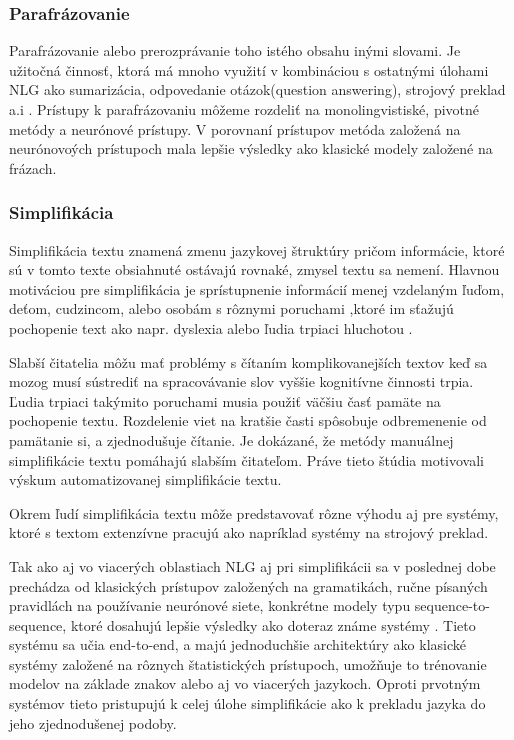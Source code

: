 \subsubsection{Parafrázovanie}
Parafrázovanie alebo prerozprávanie toho istého obsahu inými slovami. Je užitočná činnosť, ktorá má mnoho využití v kombináciou s ostatnými úlohami NLG ako sumarizácia, odpovedanie otázok(question answering), strojový preklad a.i \cite{Colin_2018_para}\cite{Mallinson_2017_para_w_mt}.
Prístupy k parafrázovaniu môžeme rozdeliť na monolingvistiské, pivotné metódy a neurónové prístupy. V porovnaní prístupov metóda založená na neurónovoých prístupoch mala lepšie výsledky ako klasické modely založené na frázach\cite{Mallinson_2017_para_w_mt}.

\subsubsection{Simplifikácia}
   Simplifikácia textu znamená zmenu jazykovej štruktúry pričom informácie, ktoré sú v tomto texte obsiahnuté ostávajú rovnaké, zmysel textu sa nemení. Hlavnou motiváciou pre simplifikácia je sprístupnenie informácií menej vzdelaným ľuďom, deťom, cudzincom, alebo osobám s rôznymi poruchami ,ktoré im sťažujú pochopenie text ako napr. dyslexia alebo ľudia trpiaci hluchotou \cite{Inui_2003_simpl_assist}.
   
   Slabší čitatelia môžu mať problémy s čítaním komplikovanejších textov keď sa mozog musí sústrediť na spracovávanie slov vyššie kognitívne činnosti trpia. Ľudia trpiaci takýmito poruchami musia použiť väčšiu časť pamäte na pochopenie textu. Rozdelenie viet na kratšie časti spôsobuje odbremenenie od pamätanie si, a zjednodušuje čítanie. Je dokázané, že metódy manuálnej simplifikácie textu pomáhajú slabším čitateľom. Práve tieto štúdia motivovali výskum automatizovanej simplifikácie textu\cite{siddharthan_2014_simpl}.
   
   Okrem ľudí simplifikácia textu môže predstavovať rôzne výhodu aj pre systémy, ktoré s textom extenzívne pracujú ako napríklad systémy na strojový preklad\cite{Chandrasekar_1996_simpl_moti}.
    
    Tak ako aj vo viacerých oblastiach NLG aj pri simplifikácii sa v poslednej dobe prechádza od klasických prístupov založených na gramatikách, ručne písaných pravidlách na používanie neurónové siete, konkrétne modely typu sequence-to-sequence, ktoré dosahujú lepšie výsledky ako doteraz známe systémy \cite{Nisioi_2017_simpl_expl}. Tieto systému sa učia end-to-end, a majú jednoduchšie architektúry ako klasické systémy založené na rôznych štatistických prístupoch, umožňuje to trénovanie modelov na základe znakov alebo aj vo viacerých jazykoch. Oproti prvotným systémov tieto pristupujú k celej úlohe simplifikácie ako k prekladu jazyka do jeho zjednodušenej podoby.
    
